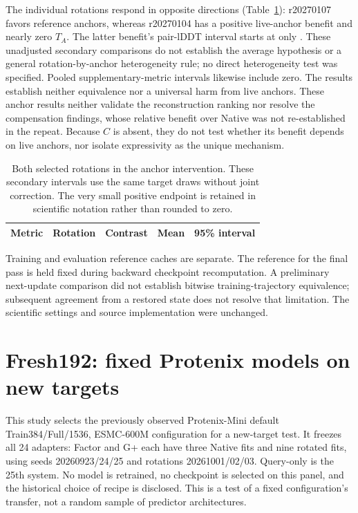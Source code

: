 The individual rotations respond in opposite directions
(Table~\ref{tab:anchor_individual}): r20270107 favors reference anchors,
whereas r20270104 has a positive live-anchor benefit and nearly zero $T_A$.
The latter benefit's pair-lDDT interval starts at only
. These unadjusted secondary
comparisons do not establish the average hypothesis or a general
rotation-by-anchor heterogeneity rule; no direct heterogeneity test was
specified. Pooled supplementary-metric intervals likewise include zero.
The results establish neither equivalence nor a universal harm from live
anchors. These anchor results neither validate the reconstruction ranking nor
resolve the compensation findings, whose relative benefit over Native was
not re-established in the repeat. Because $C$ is absent, they do not test
whether its benefit depends on live anchors, nor isolate expressivity as the
unique mechanism.

\begin{table}[!htbp]\centering\footnotesize
\caption{Both selected rotations in the anchor intervention. These secondary
intervals use the same target draws without joint correction. The very small
positive endpoint is retained in scientific notation rather than rounded to zero.}
\label{tab:anchor_individual}
\begin{tabular}{lllrr}\toprule
Metric & Rotation & Contrast & Mean & 95\% interval \\\midrule

\end{tabular}\end{table}

Training and evaluation reference caches are separate. The reference for the
final pass is held fixed during backward checkpoint recomputation. A preliminary
next-update comparison did not establish bitwise training-trajectory equivalence;
subsequent agreement from a restored state does not resolve that limitation.
The scientific settings and source implementation were unchanged.

\clearpage
\section{Fresh192: fixed Protenix models on new targets}
\label{app:fresh192}
This study selects the previously observed Protenix-Mini default
Train384/Full/1536, ESMC-600M configuration for a new-target test. It freezes
all 24 adapters: Factor and G+ each have three Native fits and nine rotated
fits, using seeds 20260923/24/25 and rotations 20261001/02/03. Query-only is the
25th system. No model is retrained, no checkpoint is selected on this panel,
and the historical choice of recipe is disclosed. This is a test of a fixed
configuration's transfer, not a random sample of predictor architectures.

